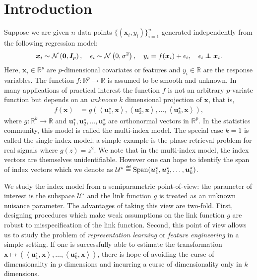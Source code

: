 \documentclass[final,12pt]{colt2018} %
\newcommand{\R}{\mathbb{R}}
\newcommand{\explain}[2]{\mathrel{\overset{\makebox[0pt]{\mbox{\normalfont\tiny\sffamily #1}}}{#2}}}
\newcommand{\gauss}[2]{\mathcal{N}\left( #1,#2 \right)}
\renewcommand\v[1]{{\ensuremath{\boldsymbol{#1}}}}
\newcommand\ip[1]{\left\langle #1 \right\rangle}
\newcommand\independent{\protect\mathpalette{\protect\independenT}{\perp}}
\def\independenT#1#2{\mathrel{\rlap{$#1#2$}\mkern2mu{#1#2}}}
\begin{document}
\section{Introduction}
Suppose we are given $n$ data points $\{(\v x_i, y_i)\}_{i=1}^n$ generated independently from the following regression model:
\begin{align}
    \v x_i \sim \gauss{\v 0}{\v I_p}, \quad \epsilon_i \sim \gauss{0}{\sigma^2}, \quad y_i = f(\v x_i) + \epsilon_i, \quad \epsilon_i \independent \v x_i . \label{model: our_model}
\end{align}
Here, $\v x_i \in \R^p$ are $p$-dimensional covariates or features and $y_i \in \R$ are the response variables. The function $f: \R^p \rightarrow \R$ is assumed to be smooth and unknown. In many applications of practical interest the function $f$ is not an arbitrary $p$-variate function but depends on  an \emph{unknown} $k$ dimensional projection of $\v x$, that is,
\begin{align}
    f(\v x) & = g(\ip{\v u_1^\star, \v x}, \ip{\v u_2^\star, \v x}, \dotsc, \ip{\v u_k^\star, \v x}) , \label{model: multiindex}
\end{align}
where $g: \R^k \rightarrow \R$ and $\v u_1^\star, \v u_2^\star, \dotsc, \v u_k^\star$ are orthonormal vectors in $\R^p$. In the statistics community, this model is called the multi-index model. The special case $k=1$ is called the single-index model; a simple example is the phase retrieval problem for real signals where $g(z) = z^2$.
We note that in the multi-index model, the index vectors are themselves unidentifiable. However one can hope to identify the span of index vectors which we denote as $\mathcal{\v U}^\star\explain{def}{=}\text{Span}(\v u_1^\star, \v u_2^\star, \dotsc, \v u_k^\star)$.

We study the index model from a semiparametric point-of-view: the parameter of interest is the subspace $\mathcal{U}^\star$ and the link function $g$ is treated as an unknown nuisance parameter. The advantages of taking this view are two-fold. First, designing procedures which make weak assumptions on the link function $g$ are robust to misspecification of the link function. Second, this point of view allows us to study the problem of \emph{representation learning} or \emph{feature engineering} in a simple setting. If one is successfully able to estimate the transformation $\v x \mapsto (\ip{\v u_1^\star, \v x}, \dotsc, \ip{\v u_k^\star, \v x})$, there is hope of avoiding the curse of dimensionality in $p$ dimensions and incurring a curse of dimensionality only in $k$ dimensions.
\end{document}
